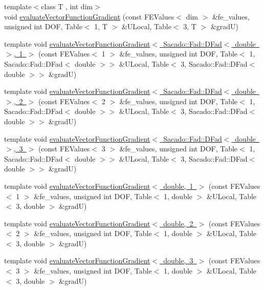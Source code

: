 \begin{DoxyCompactItemize}
{\footnotesize template$<$class T , int dim$>$ }\\void \mbox{\hyperlink{group___evaluation_functions_ga84eb2ee714466f113c96fcf6a9fd23e8}{evaluate\+Vector\+Function\+Gradient}} (const F\+E\+Values$<$ dim $>$ \&fe\+\_\+values, unsigned int D\+OF, Table$<$ 1, T $>$ \&U\+Local, Table$<$ 3, T $>$ \&gradU)
\item 
template void \mbox{\hyperlink{function_evaluations_8cc_a4c7ae8f070eed3d1d47ea4ed5dab92f9}{evaluate\+Vector\+Function\+Gradient$<$ Sacado\+::\+Fad\+::\+D\+Fad$<$ double $>$, 1 $>$}} (const F\+E\+Values$<$ 1 $>$ \&fe\+\_\+values, unsigned int D\+OF, Table$<$ 1, Sacado\+::\+Fad\+::\+D\+Fad$<$ double $>$$>$ \&U\+Local, Table$<$ 3, Sacado\+::\+Fad\+::\+D\+Fad$<$ double $>$$>$ \&gradU)
\item 
template void \mbox{\hyperlink{function_evaluations_8cc_afadde85222d3c01dcc7555e0c47d4aa9}{evaluate\+Vector\+Function\+Gradient$<$ Sacado\+::\+Fad\+::\+D\+Fad$<$ double $>$, 2 $>$}} (const F\+E\+Values$<$ 2 $>$ \&fe\+\_\+values, unsigned int D\+OF, Table$<$ 1, Sacado\+::\+Fad\+::\+D\+Fad$<$ double $>$$>$ \&U\+Local, Table$<$ 3, Sacado\+::\+Fad\+::\+D\+Fad$<$ double $>$$>$ \&gradU)
\item 
template void \mbox{\hyperlink{function_evaluations_8cc_afdde5bc51307ce007f95ba2af9d138b2}{evaluate\+Vector\+Function\+Gradient$<$ Sacado\+::\+Fad\+::\+D\+Fad$<$ double $>$, 3 $>$}} (const F\+E\+Values$<$ 3 $>$ \&fe\+\_\+values, unsigned int D\+OF, Table$<$ 1, Sacado\+::\+Fad\+::\+D\+Fad$<$ double $>$$>$ \&U\+Local, Table$<$ 3, Sacado\+::\+Fad\+::\+D\+Fad$<$ double $>$$>$ \&gradU)
\item 
template void \mbox{\hyperlink{function_evaluations_8cc_a960ffa13fae84ece6dc59bc0b91beea3}{evaluate\+Vector\+Function\+Gradient$<$ double, 1 $>$}} (const F\+E\+Values$<$ 1 $>$ \&fe\+\_\+values, unsigned int D\+OF, Table$<$ 1, double $>$ \&U\+Local, Table$<$ 3, double $>$ \&gradU)
\item 
template void \mbox{\hyperlink{function_evaluations_8cc_a268d56529013650c702d05cd22cf6148}{evaluate\+Vector\+Function\+Gradient$<$ double, 2 $>$}} (const F\+E\+Values$<$ 2 $>$ \&fe\+\_\+values, unsigned int D\+OF, Table$<$ 1, double $>$ \&U\+Local, Table$<$ 3, double $>$ \&gradU)
\item 
template void \mbox{\hyperlink{function_evaluations_8cc_aae302a9653e837488a7c5989cff31c04}{evaluate\+Vector\+Function\+Gradient$<$ double, 3 $>$}} (const F\+E\+Values$<$ 3 $>$ \&fe\+\_\+values, unsigned int D\+OF, Table$<$ 1, double $>$ \&U\+Local, Table$<$ 3, double $>$ \&gradU)

\end{DoxyCompactItemize}
